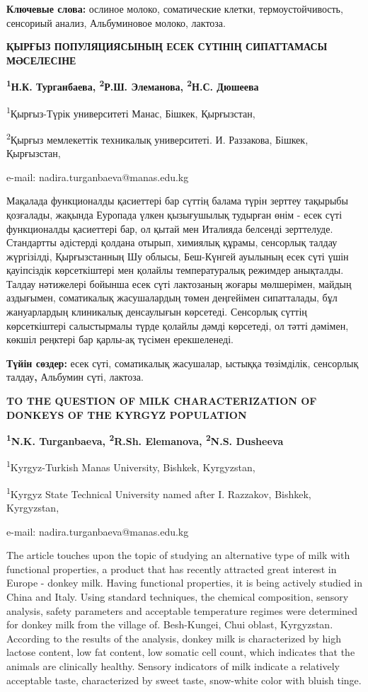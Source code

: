 {\bfseries Ключевые слова:} ослиное молоко, соматические клетки,
термоустойчивость, сенсориый анализ, Альбуминовое молоко, лактоза.

{\bfseries ҚЫРҒЫЗ ПОПУЛЯЦИЯСЫНЫҢ ЕСЕК СҮТІНІҢ СИПАТТАМАСЫ МӘСЕЛЕСІНЕ}

{\bfseries \textsuperscript{1}Н.К. Турганбаева, \textsuperscript{2}Р.Ш.
Элеманова, \textsuperscript{2}Н.С. Дюшеева}

\textsuperscript{1}Қырғыз-Түрік университеті Манас, Бішкек, Қырғызстан,

\textsuperscript{2}Қырғыз мемлекеттік техникалық университеті. И.
Раззакова, Бішкек, Қырғызстан,

e-mail: nadira.turganbaeva@manas.edu.kg

Мақалада функционалды қасиеттері бар сүттің балама түрін зерттеу
тақырыбы қозғалады, жақында Еуропада үлкен қызығушылық тудырған өнім -
есек сүті функционалды қасиеттері бар, ол қытай мен Италияда белсенді
зерттелуде. Стандартты әдістерді қолдана отырып, химиялық құрамы,
сенсорлық талдау жүргізілді, Қырғызстанның Шу облысы, Беш-Күнгей
ауылының есек сүті үшін қауіпсіздік көрсеткіштері мен қолайлы
температуралық режимдер анықталды. Талдау нәтижелері бойынша есек сүті
лактозаның жоғары мөлшерімен, майдың аздығымен, соматикалық жасушалардың
төмен деңгейімен сипатталады, бұл жануарлардың клиникалық денсаулығын
көрсетеді. Сенсорлық сүттің көрсеткіштері салыстырмалы түрде қолайлы
дәмді көрсетеді, ол тәтті дәмімен, көкшіл реңктері бар қарлы-ақ түсімен
ерекшеленеді.

{\bfseries Түйін сөздер:} есек сүті, соматикалық жасушалар, ыстыққа
төзімділік, сенсорлық талдау{\bfseries ,} Альбумин сүті, лактоза.

{\bfseries TO THE QUESTION OF MILK CHARACTERIZATION OF DONKEYS OF THE
KYRGYZ POPULATION}

{\bfseries \textsuperscript{1}N.K. Turganbaeva, \textsuperscript{2}R.Sh.
Elemanova, \textsuperscript{2}N.S. Dusheeva}

\textsuperscript{1}Kyrgyz-Turkish Manas University, Bishkek, Kyrgyzstan,

\textsuperscript{1}Kyrgyz State Technical University named after I.
Razzakov, Bishkek, Kyrgyzstan,

e-mail: nadira.turganbaeva@manas.edu.kg

The article touches upon the topic of studying an alternative type of
milk with functional properties, a product that has recently attracted
great interest in Europe - donkey milk. Having functional properties, it
is being actively studied in China and Italy. Using standard techniques,
the chemical composition, sensory analysis, safety parameters and
acceptable temperature regimes were determined for donkey milk from the
village of. Besh-Kungei, Chui oblast, Kyrgyzstan. According to the
results of the analysis, donkey milk is characterized by high lactose
content, low fat content, low somatic cell count, which indicates that
the animals are clinically healthy. Sensory indicators of milk indicate
a relatively acceptable taste, characterized by sweet taste, snow-white
color with bluish tinge.

